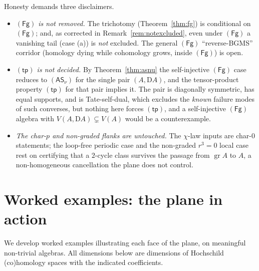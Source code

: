 \documentclass[11pt]{amsart}
\theoremstyle{definition}
\newcommand{\D}{\mathrm{D}}
\newcommand{\Fg}{\mathsf{(Fg)}}
\newcommand{\tp}{\mathsf{(tp)}}
\newcommand{\ASnu}{\mathsf{(AS_\nu)}}
\newcommand{\gr}{\operatorname{gr}}
\begin{document}
Honesty demands three disclaimers.
\begin{itemize}[leftmargin=1.4em]
\item \emph{$\Fg$ is not removed.} The trichotomy (Theorem~\ref{thm:fg}) is
conditional on $\Fg$; and, as corrected in Remark~\ref{rem:notexcluded}, even
under $\Fg$ a vanishing tail (case (a)) is \emph{not} excluded. The general
$\Fg$ ``reverse-BGMS'' corridor (homology dying while cohomology grows,
inside $\Fg$) is open.
\item \emph{$\tp$ is not decided.} By Theorem~\ref{thm:asnu} the
self-injective $\Fg$ case reduces to $\ASnu$ for the single pair
$(A,\D A)$, and the tensor-product property $\tp$ for that pair implies it. The pair is diagonally symmetric, has equal supports, and is
Tate-self-dual, which excludes the \emph{known} failure modes of such
converses, but nothing here forces $\tp$, and a self-injective $\Fg$
algebra with $V(A,\D A)\subsetneq V(A)$ would be a counterexample.
\item \emph{The char-$p$ and non-graded flanks are untouched.} The $\chi$-law
inputs are char-$0$ statements; the loop-free periodic case and the non-graded
$r^3=0$ local case rest on certifying that a $2$-cycle class survives the
passage from $\gr A$ to $A$, a non-homogeneous cancellation the plane does not
control.
\end{itemize}

\section{Worked examples: the plane in action}\label{sec:examples}\label{sec:comp}

We develop worked examples illustrating each face of the plane, on meaningful
non-trivial algebras. All dimensions below are dimensions of Hochschild
(co)homology spaces with the indicated coefficients.
\end{document}
